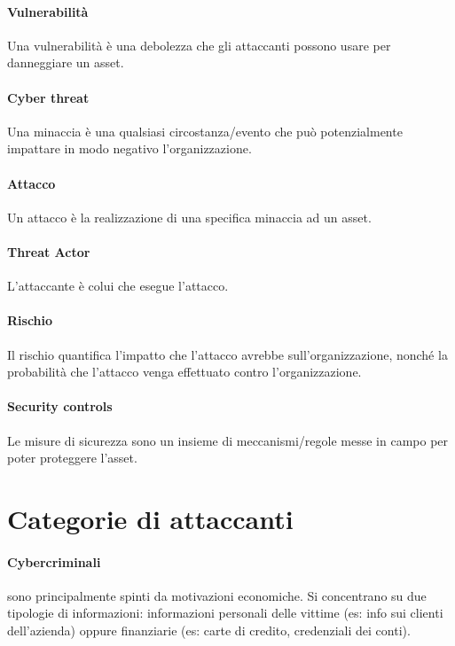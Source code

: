 \paragraph*{Vulnerabilità} Una vulnerabilità è una debolezza che gli attaccanti possono usare per danneggiare un asset.

\paragraph*{Cyber threat} Una minaccia è una qualsiasi circostanza/evento che può potenzialmente impattare in modo negativo l'organizzazione.

\paragraph*{Attacco} Un attacco è la realizzazione di una specifica minaccia ad un asset.

\paragraph*{Threat Actor} L'attaccante è colui che esegue l'attacco.

\paragraph*{Rischio} Il rischio quantifica l'impatto che l'attacco avrebbe sull'organizzazione, nonché la probabilità che l'attacco venga effettuato contro l'organizzazione.

\paragraph*{Security controls} Le misure di sicurezza sono un insieme di meccanismi/regole messe in campo per poter proteggere l'asset.

\section{Categorie di attaccanti}

\paragraph{Cybercriminali} sono principalmente spinti da motivazioni economiche. Si concentrano su due tipologie di informazioni: informazioni personali delle vittime (es: info sui clienti dell'azienda) oppure finanziarie (es: carte di credito, credenziali dei conti). 

